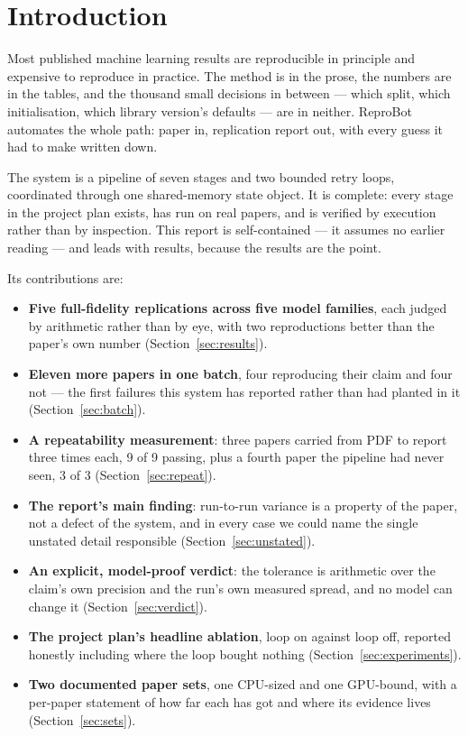 \documentclass[10pt,twocolumn]{article}
\begin{document}
\section{Introduction}
\label{sec:intro}

Most published machine learning results are reproducible in principle and expensive to reproduce
in practice. The method is in the prose, the numbers are in the tables, and the thousand small
decisions in between --- which split, which initialisation, which library version's defaults ---
are in neither. ReproBot automates the whole path: paper in, replication report out, with every
guess it had to make written down.

The system is a pipeline of seven stages and two bounded retry loops, coordinated through one
shared-memory state object. It is complete: every stage in the project plan exists, has run on
real papers, and is verified by execution rather than by inspection. This report is
self-contained --- it assumes no earlier reading --- and leads with results, because the
results are the point.

Its contributions are:

\begin{itemize}
  \item \textbf{Five full-fidelity replications across five model families}, each judged by
    arithmetic rather than by eye, with two reproductions better than the paper's own number
    (Section~\ref{sec:results}).
  \item \textbf{Eleven more papers in one batch}, four reproducing their claim and four not ---
    the first failures this system has reported rather than had planted in it
    (Section~\ref{sec:batch}).
  \item \textbf{A repeatability measurement}: three papers carried from PDF to report three
    times each, 9 of 9 passing, plus a fourth paper the pipeline had never seen, 3 of 3
    (Section~\ref{sec:repeat}).
  \item \textbf{The report's main finding}: run-to-run variance is a property of the paper, not
    a defect of the system, and in every case we could name the single unstated detail
    responsible (Section~\ref{sec:unstated}).
  \item \textbf{An explicit, model-proof verdict}: the tolerance is arithmetic over the claim's
    own precision and the run's own measured spread, and no model can change it
    (Section~\ref{sec:verdict}).
  \item \textbf{The project plan's headline ablation}, loop on against loop off, reported
    honestly including where the loop bought nothing (Section~\ref{sec:experiments}).
  \item \textbf{Two documented paper sets}, one CPU-sized and one GPU-bound, with a per-paper
    statement of how far each has got and where its evidence lives (Section~\ref{sec:sets}).
\end{itemize}
\end{document}
